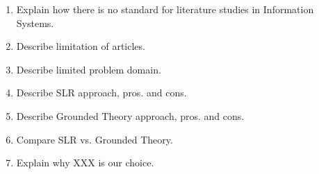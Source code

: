 \begin{enumerate}
	\item Explain how there is no standard for literature studies in Information Systems.
	\item Describe limitation of articles.
	\item Describe limited problem domain.
	\item Describe SLR approach, pros. and cons.
	\item Describe Grounded Theory approach, pros. and cons.
	\item Compare SLR vs. Grounded Theory.
	\item Explain why XXX is our choice.
\end{enumerate}
